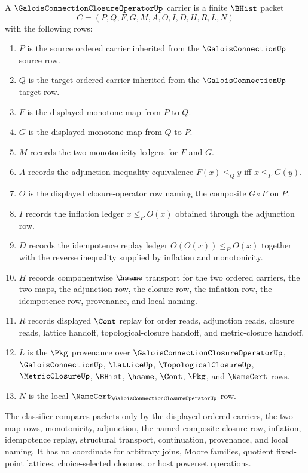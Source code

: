 \begin{definition}
\label{def:galois-connection-closure-operator-carrier}
A $\GaloisConnectionClosureOperatorUp$ carrier is a finite $\BHist$ packet
$$
C=(P,Q,F,G,M,A,O,I,D,H,R,L,N)
$$
with the following rows:
\begin{enumerate}
\item $P$ is the source ordered carrier inherited from the $\GaloisConnectionUp$ source row.
\item $Q$ is the target ordered carrier inherited from the $\GaloisConnectionUp$ target row.
\item $F$ is the displayed monotone map from $P$ to $Q$.
\item $G$ is the displayed monotone map from $Q$ to $P$.
\item $M$ records the two monotonicity ledgers for $F$ and $G$.
\item $A$ records the adjunction inequality equivalence $F(x)\leq_Q y$ iff $x\leq_P G(y)$.
\item $O$ is the displayed closure-operator row naming the composite $G\circ F$ on $P$.
\item $I$ records the inflation ledger $x\leq_P O(x)$ obtained through the adjunction row.
\item $D$ records the idempotence replay ledger $O(O(x))\leq_P O(x)$ together with the reverse inequality supplied by inflation and monotonicity.
\item $H$ records componentwise $\hsame$ transport for the two ordered carriers, the two maps, the adjunction row, the closure row, the inflation row, the idempotence row, provenance, and local naming.
\item $R$ records displayed $\Cont$ replay for order reads, adjunction reads, closure reads, lattice handoff, topological-closure handoff, and metric-closure handoff.
\item $L$ is the $\Pkg$ provenance over $\GaloisConnectionClosureOperatorUp$, $\GaloisConnectionUp$, $\LatticeUp$, $\TopologicalClosureUp$, $\MetricClosureUp$, $\BHist$, $\hsame$, $\Cont$, $\Pkg$, and $\NameCert$ rows.
\item $N$ is the local $\NameCert_{\GaloisConnectionClosureOperatorUp}$ row.
\end{enumerate}
The classifier compares packets only by the displayed ordered carriers, the two map rows, monotonicity, adjunction, the named composite closure row, inflation, idempotence replay, structural transport, continuation, provenance, and local naming. It has no coordinate for arbitrary joins, Moore families, quotient fixed-point lattices, choice-selected closures, or host powerset operations.
\end{definition}

